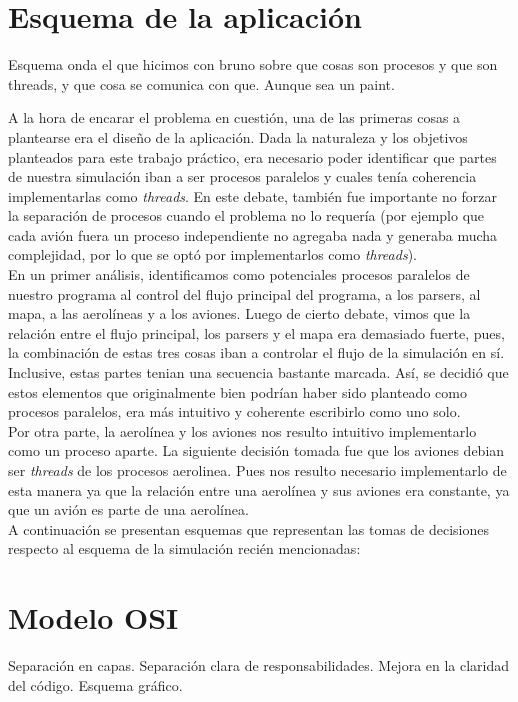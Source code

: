 \documentclass[a4paper,10pt]{article}
\begin{document}
\newpage
\section{Esquema de la aplicación}
Esquema onda el que hicimos con bruno sobre que cosas son procesos y que son threads, y que cosa se comunica con que. Aunque sea un paint.

A la hora de encarar el problema en cuestión, una de las primeras cosas a plantearse era el diseño de la aplicación. Dada la naturaleza y los objetivos planteados para este
 trabajo práctico, era necesario poder identificar que partes de nuestra simulación iban a ser procesos paralelos y cuales tenía coherencia implementarlas como \textit{threads}.
  En este debate, también fue importante no forzar la separación de procesos cuando el problema no lo requería (por ejemplo que cada avión fuera un proceso independiente no agregaba 
  nada y generaba mucha complejidad, por lo que se optó por implementarlos como \textit{threads}).\\ 

En un primer análisis, identificamos como potenciales procesos paralelos de nuestro programa al control del flujo principal del programa, a los parsers, al mapa, a las aerolíneas y
 a los aviones. Luego de cierto debate, vimos que la relación entre el flujo principal, los parsers y el mapa era demasiado fuerte, pues, la combinación de estas tres cosas iban a 
 controlar el flujo de la simulación en sí. Inclusive, estas partes tenian una secuencia bastante marcada. Así, se decidió que estos elementos que originalmente bien podrían haber 
 sido planteado como procesos paralelos, era más intuitivo y coherente escribirlo como uno solo.\\

Por otra parte, la aerolínea y los aviones nos resulto intuitivo implementarlo como un proceso aparte. La siguiente decisión tomada fue que los aviones debian ser \textit{threads}
 de los procesos aerolinea. Pues nos resulto necesario implementarlo de esta manera ya que la relación entre una aerolínea y sus aviones era constante, ya que un avión es parte
  de una aerolínea.\\

A continuación se presentan esquemas que representan las tomas de decisiones respecto al esquema de la simulación recién mencionadas:

\newpage
\section{Modelo OSI}
Separación en capas. Separación clara de responsabilidades. Mejora en la claridad del código.
Esquema gráfico.
\end{document}
